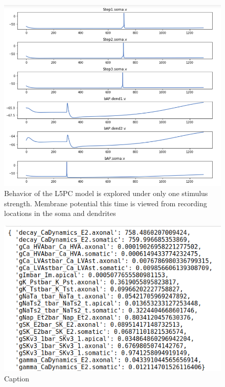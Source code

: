 \begin{figure}
    \centering
    \includegraphics{figures/l5pc}
    \caption[Behavior of the L5PC model under optimized parameters]{Behavior of the L5PC model is explored under only one stimulus strength. Membrane potential this time is viewed from recording locations in the soma and dendrites}
    \label{fig:after_optimization}
\end{figure}

\begin{figure}
    \centering
    \includegraphics{figures/parameters_opt_l5pc.png}
    \caption{Caption}
    \label{fig:ca1_parameters}
\end{figure}




